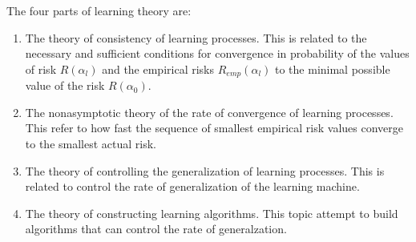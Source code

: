 \documentclass{article}
\begin{document}
The four parts of learning theory are:
\begin{enumerate}
    \item The theory of consistency of learning processes. This is related to the necessary and sufficient conditions for convergence in probability of the values of risk $R(\alpha_{l})$ and the empirical risks $R_{emp}(\alpha_{l})$ to the minimal possible value of the risk $R(\alpha_{0})$.
    \item The nonasymptotic theory of the rate of convergence of learning processes. This refer to how fast the sequence of smallest empirical risk values converge to the smallest actual risk.
    \item The theory of controlling the generalization of learning processes. This is related to control the rate of generalization of the learning machine.
    \item The theory of constructing learning algorithms. This topic attempt to build algorithms that can control the rate of generalzation.
\end{enumerate}
\end{document}
